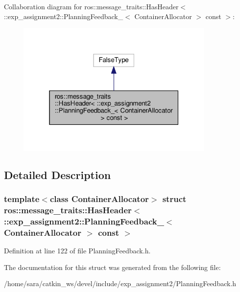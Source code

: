 Collaboration diagram for ros\+:\+:message\+\_\+traits\+:\+:Has\+Header$<$ \+:\+:exp\+\_\+assignment2\+:\+:Planning\+Feedback\+\_\+$<$ Container\+Allocator $>$ const $>$\+:
\nopagebreak
\begin{figure}[H]
\begin{center}
\leavevmode
\includegraphics[width=277pt]{structros_1_1message__traits_1_1HasHeader_3_01_1_1exp__assignment2_1_1PlanningFeedback___3_01Con134074ebe4b1f9749d8b18db899aaf51}
\end{center}
\end{figure}


\subsection{Detailed Description}
\subsubsection*{template$<$class Container\+Allocator$>$\newline
struct ros\+::message\+\_\+traits\+::\+Has\+Header$<$ \+::exp\+\_\+assignment2\+::\+Planning\+Feedback\+\_\+$<$ Container\+Allocator $>$ const $>$}



Definition at line 122 of file Planning\+Feedback.\+h.



The documentation for this struct was generated from the following file\+:\begin{DoxyCompactItemize}
\item 
/home/sara/catkin\+\_\+ws/devel/include/exp\+\_\+assignment2/Planning\+Feedback.\+h\end{DoxyCompactItemize}
